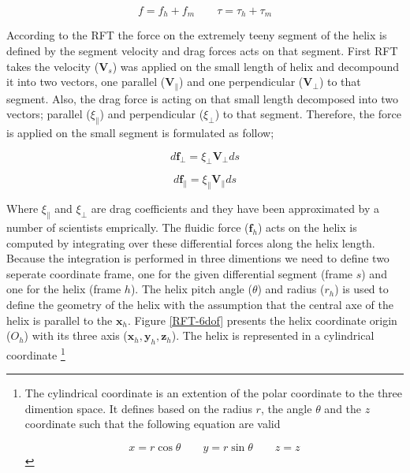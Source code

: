 \documentclass[12pt,a4paper,titlepage]{report}
\begin{document}
\begin{equation}
 f = f_h + f_m \qquad  \tau = \tau_h + \tau_m
\label{total_force_torque}
\end{equation}

According to the \ac*{RFT} the force on the extremely teeny segment of the helix is defined by 
the segment velocity and drag forces acts on that segment. First \ac*{RFT} takes the
 velocity ($\bm{V}_s$) was applied on the small length
of helix and decompound it into two vectors, one parallel ($\bm{V}_{\parallel}$) and one perpendicular ($\bm{V}_{\perp}$)
 to that segment. Also, the drag force is acting on that small length decomposed into two 
vectors; parallel (${\xi}_{\parallel}$) and perpendicular (${\xi}_{\perp}$) to that segment.  
Therefore, the force is applied on the small segment is formulated as follow; 

\begin{equation}
 d{\bm{f}_{\perp}} = {\xi}_{\perp}{\bm{V}_{\perp}}ds 
\label{relation-force_drag}
\end{equation}

\begin{equation}
 d{\bm{f}_{\parallel}} = {\xi}_{\parallel}{\bm{V}_{\parallel}}ds
\label{relation-force_drag}
\end{equation}

Where ${\xi}_{\parallel}$ and ${\xi}_{\perp}$ are drag coefficients and they have been approximated by a number
of scientists emprically. The fluidic force ($ \bm{f}_h$) acts on the helix is computed by integrating over these 
differential forces along the helix length. Because the integration is performed in three dimentions
 we need to define two seperate coordinate frame, one for the given
differential segment (frame $s$) and one for the helix (frame $h$). The helix pitch angle ($\theta$) 
and radius ($r_h$) is used to define the geometry of the helix with the assumption that the central
 axe of the helix is
parallel to the $\bm{x}_h$. Figure \ref{RFT-6dof} presents the helix coordinate origin ($O_h$) with 
its three axis ($\bm{x}_h , \bm{y}_h , \bm{z}_h$). The helix is represented in a cylindrical coordinate
\footnote{The cylindrical coordinate is an extention of the polar coordinate to the three dimention space. It
defines based on the radius $r$, the angle $\theta$ and the $z$ coordinate such that the following equation
are valid

\begin{equation}
 x = r\cos{\theta} \qquad  y = r\sin{\theta}  \qquad  z = z
\label{cylindrical_coordinate}
\end{equation}
}
\end{document}
